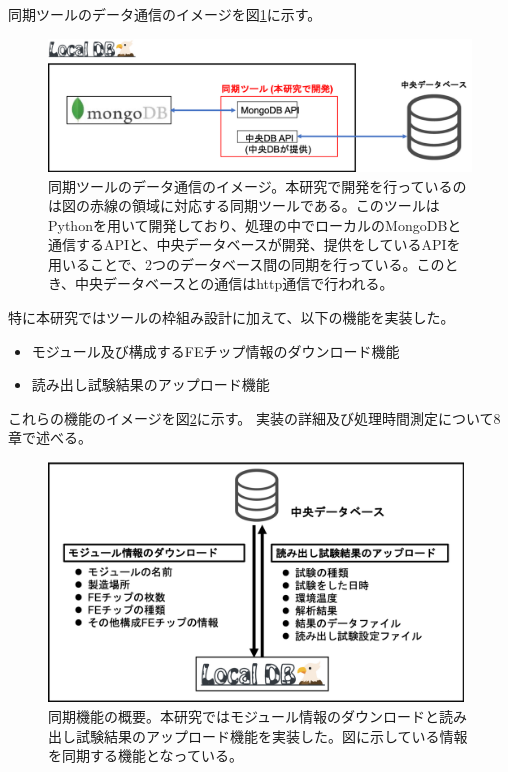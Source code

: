 同期ツールのデータ通信のイメージを図\ref{interfacing_tools_system}に示す。
\begin{figure}[bpt]\centering
\includegraphics[width=13cm]{interfacing_tools_system}
\caption[同期ツールのデータ通信のイメージ]{同期ツールのデータ通信のイメージ。本研究で開発を行っているのは図の赤線の領域に対応する同期ツールである。このツールはPythonを用いて開発しており、処理の中でローカルのMongoDBと通信するAPIと、中央データベースが開発、提供をしているAPIを用いることで、2つのデータベース間の同期を行っている。このとき、中央データベースとの通信はhttp通信で行われる。}
\label{interfacing_tools_system}
\end{figure}

特に本研究ではツールの枠組み設計に加えて、以下の機能を実装した。
\begin{itemize}
  \item モジュール及び構成するFEチップ情報のダウンロード機能
  \item 読み出し試験結果のアップロード機能
\end{itemize}

これらの機能のイメージを図\ref{interface_overview}に示す。
実装の詳細及び処理時間測定について8章で述べる。

\begin{figure}[bpt]\centering
\includegraphics[width=11cm]{interface_overview}
\caption[同期機能の概要]{同期機能の概要。本研究ではモジュール情報のダウンロードと読み出し試験結果のアップロード機能を実装した。図に示している情報を同期する機能となっている。}
\label{interface_overview}
\end{figure}

